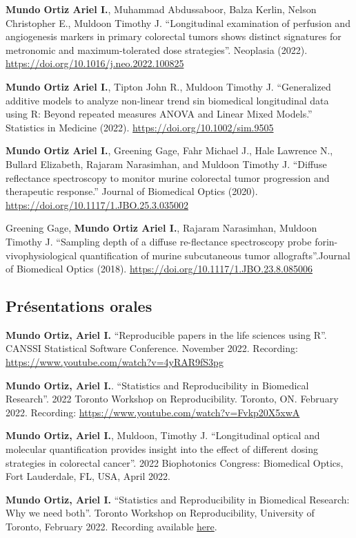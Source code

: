 \documentclass[10pt,]{article}
\begin{document}
\textbf{Mundo Ortiz Ariel I.}, Muhammad Abdussaboor, Balza Kerlin,
Nelson Christopher E., Muldoon Timothy J. ``Longitudinal examination of
perfusion and angiogenesis markers in primary colorectal tumors shows
distinct signatures for metronomic and maximum-tolerated dose
strategies''. Neoplasia (2022).
\url{https://doi.org/10.1016/j.neo.2022.100825}

\textbf{Mundo Ortiz Ariel I.}, Tipton John R., Muldoon Timothy J.
``Generalized additive models to analyze non-linear trend sin biomedical
longitudinal data using R: Beyond repeated measures ANOVA and Linear
Mixed Models.'' Statistics in Medicine (2022).
\url{https://doi.org/10.1002/sim.9505}

\textbf{Mundo Ortiz Ariel I.}, Greening Gage, Fahr Michael J., Hale
Lawrence N., Bullard Elizabeth, Rajaram Narasimhan, and Muldoon Timothy
J. ``Diffuse reflectance spectroscopy to monitor murine colorectal tumor
progression and therapeutic response.'' Journal of Biomedical Optics
(2020). \url{https://doi.org/10.1117/1.JBO.25.3.035002}

Greening Gage, \textbf{Mundo Ortiz Ariel I.}, Rajaram Narasimhan,
Muldoon Timothy J. ``Sampling depth of a diffuse re-flectance
spectroscopy probe forin-vivophysiological quantification of murine
subcutaneous tumor allografts''.Journal of Biomedical Optics (2018).
\url{https://doi.org/10.1117/1.JBO.23.8.085006}

\subsection{Présentations orales}\label{pruxe9sentations-orales}

\textbf{Mundo Ortiz, Ariel I.} ``Reproducible papers in the life
sciences using R''. CANSSI Statistical Software Conference. November
2022. Recording: \url{https://www.youtube.com/watch?v=4yRAR9fS3pg}

\textbf{Mundo Ortiz, Ariel I.}. ``Statistics and Reproducibility in
Biomedical Research''. 2022 Toronto Workshop on Reproducibility.
Toronto, ON. February 2022. Recording:
\url{https://www.youtube.com/watch?v=Fvkp20X5xwA}

\textbf{Mundo Ortiz, Ariel I.}, Muldoon, Timothy J. ``Longitudinal
optical and molecular quantification provides insight into the effect of
different dosing strategies in colorectal cancer''. 2022 Biophotonics
Congress: Biomedical Optics, Fort Lauderdale, FL, USA, April 2022.

\textbf{Mundo Ortiz, Ariel I.} ``Statistics and Reproducibility in
Biomedical Research: Why we need both''. Toronto Workshop on
Reproducibility, University of Toronto, February 2022. Recording
available \href{https://www.youtube.com/watch?v=Fvkp20X5xwA}{here}.
\end{document}
